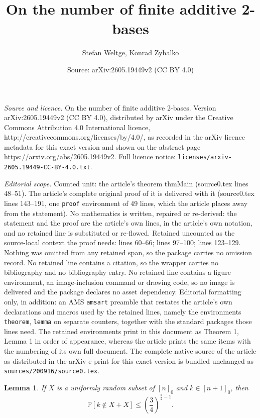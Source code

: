 \documentclass[10pt,a4paper]{amsart}
\title{On the number of finite additive 2-bases}
\author{Stefan Weltge, Konrad Zyhalko}
\date{Source: arXiv:2605.19449v2 (CC BY 4.0)}
\newtheorem{lemma}{Lemma}
\newcommand{\prob}{\mathbb{P}}
\begin{document}
\maketitle

\noindent\emph{Source and licence.} On the number of finite additive 2-bases. Version arXiv:2605.19449v2 (CC BY 4.0), distributed by arXiv under the Creative Commons Attribution 4.0 International licence, http://creativecommons.org/licenses/by/4.0/, as recorded in the arXiv licence metadata for this exact version and shown on the abstract page https://arxiv.org/abs/2605.19449v2. Full licence notice: \texttt{licenses/arxiv-2605.19449-CC-BY-4.0.txt}.\par\smallskip

\noindent\textit{Editorial scope.} Counted unit: the article's theorem thmMain (source0.tex lines 48--51). The article's complete original proof of it is delivered with it (source0.tex lines 143--191, one \texttt{proof} environment of 49 lines, which the article places away from the statement). No mathematics is written, repaired or re-derived: the statement and the proof are the article's own lines, in the article's own notation, and no retained line is substituted or re-flowed.  Retained uncounted as the source-local context the proof needs: lines 60--66; lines 97--100; lines 123--129.  Nothing was omitted from any retained span, so the package carries no omission record.  No retained line contains a citation, so the wrapper carries no bibliography and no bibliography entry.  No retained line contains a figure environment, an image-inclusion command or drawing code, so no image is delivered and the package declares no asset dependency.  Editorial formatting only, in addition: an AMS \texttt{amsart} preamble that restates the article's own declarations and macros used by the retained lines, namely the environments \texttt{theorem}, \texttt{lemma} on separate counters, together with the standard packages those lines need.  The retained environments print in this document as Theorem 1, Lemma 1 in order of appearance, whereas the article prints the same items with the numbering of its own full document.  The complete native source of the article as distributed in the arXiv e-print for this exact version is bundled unchanged as \texttt{sources/200916/source0.tex}.
\begin{lemma}
    \label{lemNotGenerated}
    If $X$ is a uniformly random subset of $[n]_0$ and $k \in [n + 1]_0$, then
    \[
        \prob[k \notin X + X] \le \left( \frac{3}{4} \right)^{\frac{k}{2} - 1}.
    \]
\end{lemma}
\end{document}
